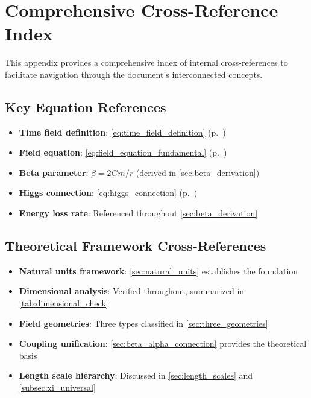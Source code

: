 \documentclass[12pt,a4paper]{article}
\begin{document}
	\appendix
	
	\section{Comprehensive Cross-Reference Index}
	\label{app:cross_references}
	
	This appendix provides a comprehensive index of internal cross-references to facilitate navigation through the document's interconnected concepts.
	
	\subsection{Key Equation References}
	\label{app:key_equations}
	
	\begin{itemize}
		\item \textbf{Time field definition}: \cref{eq:time_field_definition} (p.~\pageref{eq:time_field_definition})
		\item \textbf{Field equation}: \cref{eq:field_equation_fundamental} (p.~\pageref{eq:field_equation_fundamental})
		\item \textbf{Beta parameter}: $\beta = 2Gm/r$ (derived in \cref{sec:beta_derivation})
		\item \textbf{Higgs connection}: \cref{eq:higgs_connection} (p.~\pageref{eq:higgs_connection})
		\item \textbf{Energy loss rate}: Referenced throughout \cref{sec:beta_derivation}
	\end{itemize}
	
	\subsection{Theoretical Framework Cross-References}
	\label{app:theoretical_framework}
	
	\begin{itemize}
		\item \textbf{Natural units framework}: \cref{sec:natural_units} establishes the foundation
		\item \textbf{Dimensional analysis}: Verified throughout, summarized in \cref{tab:dimensional_check}
		\item \textbf{Field geometries}: Three types classified in \cref{sec:three_geometries}
		\item \textbf{Coupling unification}: \cref{sec:beta_alpha_connection} provides the theoretical basis
		\item \textbf{Length scale hierarchy}: Discussed in \cref{sec:length_scales} and \cref{subsec:xi_universal}
	\end{itemize}
	
\end{document}
